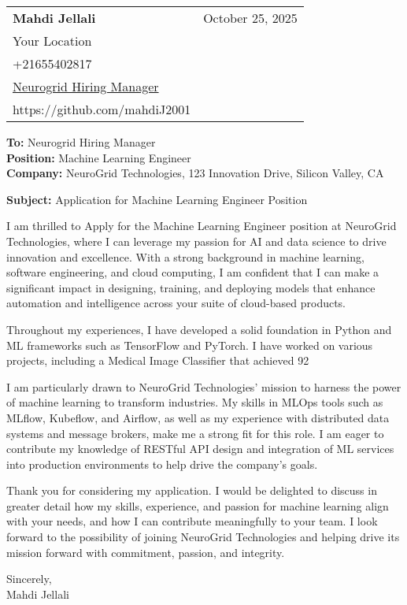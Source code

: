 \documentclass[letterpaper,11pt]{article}
\makeatletter
\newcommand{\letterHeading}[5]{
    \begin{tabular*}{\textwidth}{l@{\extracolsep{\fill}}r}
    \textbf{\Large #1} & #5 \\  %
    #2 & \\
    #3 & \\
    #4 & \\
    \end{tabular*}
    \vspace{15pt}
}
\newcommand{\letterRecipient}[3]{
    \textbf{\large To:} #1 \\
    \textbf{\large Position:} #2 \\
    \textbf{\large Company:} #3 \\
    \vspace{12pt}
}
\newcommand{\letterSubject}[1]{
    \textbf{\large Subject:} #1 \\
    \vspace{15pt}
}
\makeatother
\begin{document}
    \letterHeading
    {Mahdi Jellali}
    {Your Location}
    {+21655402817 \\ \href{mailto:Neurogrid Hiring Manager}{Neurogrid Hiring Manager}}
    {https://github.com/mahdiJ2001}
    {October 25, 2025}

    \letterRecipient
    {Neurogrid Hiring Manager}
    {Machine Learning Engineer}
    {NeuroGrid Technologies, 123 Innovation Drive, Silicon Valley, CA}

    \letterSubject{Application for Machine Learning Engineer Position}

I am thrilled to Apply for the Machine Learning Engineer position at NeuroGrid Technologies, where I can leverage my passion for AI and data science to drive innovation and excellence. With a strong background in machine learning, software engineering, and cloud computing, I am confident that I can make a significant impact in designing, training, and deploying models that enhance automation and intelligence across your suite of cloud-based products.

    Throughout my experiences, I have developed a solid foundation in Python and ML frameworks such as TensorFlow and PyTorch. I have worked on various projects, including a Medical Image Classifier that achieved 92%

    I am particularly drawn to NeuroGrid Technologies' mission to harness the power of machine learning to transform industries. My skills in MLOps tools such as MLflow, Kubeflow, and Airflow, as well as my experience with distributed data systems and message brokers, make me a strong fit for this role. I am eager to contribute my knowledge of RESTful API design and integration of ML services into production environments to help drive the company's goals.

    Thank you for considering my application. I would be delighted to discuss in greater detail how my skills, experience, and passion for machine learning align with your needs, and how I can contribute meaningfully to your team. I look forward to the possibility of joining NeuroGrid Technologies and helping drive its mission forward with commitment, passion, and integrity.

    Sincerely,\\[12pt]

    Mahdi Jellali
\end{document}

